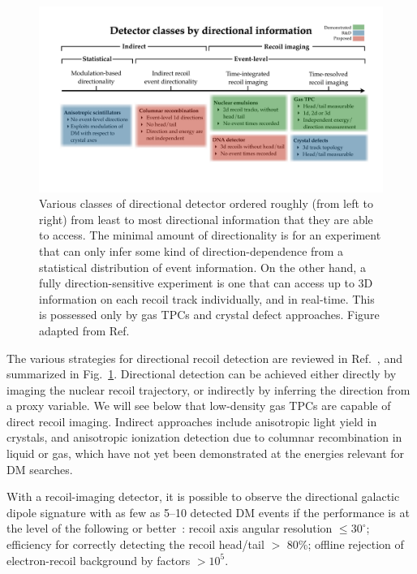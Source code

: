 \begin{figure}[ht!]
\begin{center}
\includegraphics[width=0.9\columnwidth]{figures/DetectorClassTableAR.pdf}
\caption{Various classes of directional detector ordered roughly (from left to right) from least to most directional information that they are able to access. The minimal amount of directionality is for an experiment that can only infer some kind of direction-dependence from a statistical distribution of event information. On the other hand, a fully direction-sensitive experiment is one that can access up to 3D information on each recoil track individually, and in real-time. This is possessed only by gas TPCs and crystal defect approaches. Figure adapted from Ref.~\cite{Vahsen:2021gnb}}\label{directional_classification}
\end{center}
\end{figure}

The various strategies for directional recoil detection are reviewed in Ref.~\cite{Vahsen:2021gnb}, and summarized in Fig.~\ref{directional_classification}.  Directional detection can be achieved either directly by imaging the nuclear recoil trajectory, or indirectly by inferring the direction from a proxy variable.  We will see below that low-density gas TPCs are capable of direct recoil imaging. Indirect approaches include anisotropic light yield in crystals, and anisotropic ionization detection due to columnar recombination in liquid or gas, which have not yet been demonstrated at the energies relevant for DM searches.

With a recoil-imaging detector, it is possible to observe the directional galactic dipole signature with as few as 5--10 detected DM events if the performance is at the level of the following or better~\cite{Vahsen:2021gnb}: recoil axis angular resolution $\leq 30^\circ$; efficiency for correctly detecting the recoil head/tail $>$ 80\%; offline rejection of electron-recoil background by factors $>10^5$.

